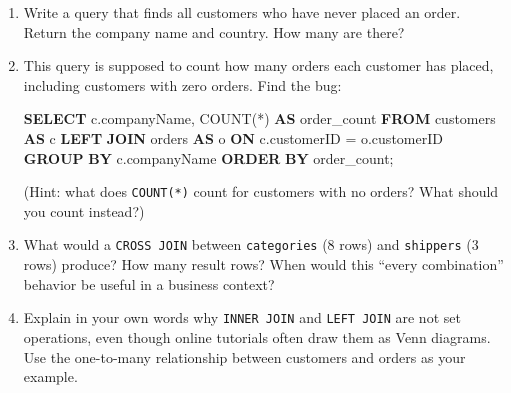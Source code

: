 \documentclass[
  letterpaper,
  DIV=11,
  numbers=noendperiod]{scrreprt}
\newenvironment{Shaded}{\begin{snugshade}}{\end{snugshade}}
\newcommand{\FunctionTok}[1]{\textcolor[rgb]{0.28,0.35,0.67}{#1}}
\newcommand{\KeywordTok}[1]{\textcolor[rgb]{0.00,0.23,0.31}{\textbf{#1}}}
\newcommand{\NormalTok}[1]{\textcolor[rgb]{0.00,0.23,0.31}{#1}}
\newcommand{\OperatorTok}[1]{\textcolor[rgb]{0.37,0.37,0.37}{#1}}
\begin{document}
\begin{tcolorbox}[enhanced jigsaw, opacitybacktitle=0.6, arc=.35mm, colback=white, bottomtitle=1mm, opacityback=0, toprule=.15mm, left=2mm, colbacktitle=quarto-callout-note-color!10!white, breakable, coltitle=black, toptitle=1mm, colframe=quarto-callout-note-color-frame, bottomrule=.15mm, titlerule=0mm, title=\textcolor{quarto-callout-note-color}{\faInfo}\hspace{0.5em}{Exercises}, rightrule=.15mm, leftrule=.75mm]

\begin{enumerate}
\def\labelenumi{\arabic{enumi}.}
\item
  Write a query that finds all customers who have never placed an order.
  Return the company name and country. How many are there?
\item
  This query is supposed to count how many orders each customer has
  placed, including customers with zero orders. Find the bug:

  \begin{codelisting}

  \caption{\texttt{duckdb}}

\begin{Shaded}
\begin{Highlighting}[]
\KeywordTok{SELECT}
\NormalTok{    c.companyName,}
    \FunctionTok{COUNT}\NormalTok{(}\OperatorTok{*}\NormalTok{) }\KeywordTok{AS}\NormalTok{ order\_count}
\KeywordTok{FROM}\NormalTok{ customers }\KeywordTok{AS}\NormalTok{ c}
\KeywordTok{LEFT} \KeywordTok{JOIN}\NormalTok{ orders }\KeywordTok{AS}\NormalTok{ o}
    \KeywordTok{ON}\NormalTok{ c.customerID }\OperatorTok{=}\NormalTok{ o.customerID}
\KeywordTok{GROUP} \KeywordTok{BY}\NormalTok{ c.companyName}
\KeywordTok{ORDER} \KeywordTok{BY}\NormalTok{ order\_count;}
\end{Highlighting}
\end{Shaded}

  \end{codelisting}

  (Hint: what does \texttt{COUNT(*)} count for customers with no orders?
  What should you count instead?)
\item
  What would a \texttt{CROSS\ JOIN} between \texttt{categories} (8 rows)
  and \texttt{shippers} (3 rows) produce? How many result rows? When
  would this ``every combination'' behavior be useful in a business
  context?
\item
  Explain in your own words why \texttt{INNER\ JOIN} and
  \texttt{LEFT\ JOIN} are not set operations, even though online
  tutorials often draw them as Venn diagrams. Use the one-to-many
  relationship between customers and orders as your example.
\end{enumerate}

\end{tcolorbox}
\end{document}
